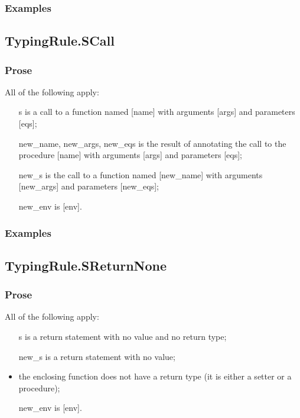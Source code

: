\documentclass{book}
\begin{document}
    \subsubsection{Examples}

\subsection{TypingRule.SCall}

    \subsubsection{Prose}
    All of the following apply:
   \begin{itemize}
   \item [s] is a call to a function named [name] with arguments [args] and parameters [eqs];
   \item [new\_name, new\_args, new\_eqs] is the result of annotating the call
      to the procedure [name] with arguments [args] and parameters
[eqs];
   \item [new\_s] is the call to a function named [new\_name] with arguments
      [new\_args] and parameters [new\_eqs];
   \item [new\_env] is [env].
   \end{itemize}

    \subsubsection{Examples}

\subsection{TypingRule.SReturnNone}

    \subsubsection{Prose}
    All of the following apply:
   \begin{itemize}
   \item [s] is a return statement with no value and no return type; 
   \item [new\_s] is a return statement with no value;
   \item the enclosing function does not have a return type (it is either a setter
      or a procedure);
   \item [new\_env] is [env].
   \end{itemize}
\end{document}
